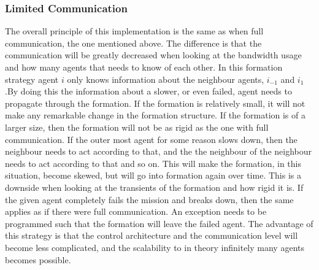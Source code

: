 \subsubsection{Limited Communication}
The overall principle of this implementation is the same as when full communication, the one mentioned above. The difference is that the communication will be greatly decreased when looking at the bandwidth usage and how many agents that needs to know of each other. In this formation strategy agent $i$ only knows information about the neighbour agents, $i_{-1}$ and $i_{1}$.By doing this the information about a slower, or even failed, agent needs to propagate through the formation. If the formation is relatively small, it will not make any remarkable change in the formation structure. If the formation is of a larger size, then the formation will not be as rigid as the one with full communication. If the outer most agent for some reason slows down, then the neighbour needs to act according to that, and the the neighbour of the neighbour needs to act according to that and so on. This will make the formation, in this situation, become skewed, but will go into formation again over time. This is a downside when looking at the transients of the formation and how rigid it is. If the given agent completely fails the mission and breaks down, then the same applies as if there were full communication. An exception needs to be programmed such that the formation will leave the failed agent. The advantage of this strategy is that the control architecture and the communication level will become less complicated, and the scalability to in theory infinitely many agents becomes possible.

